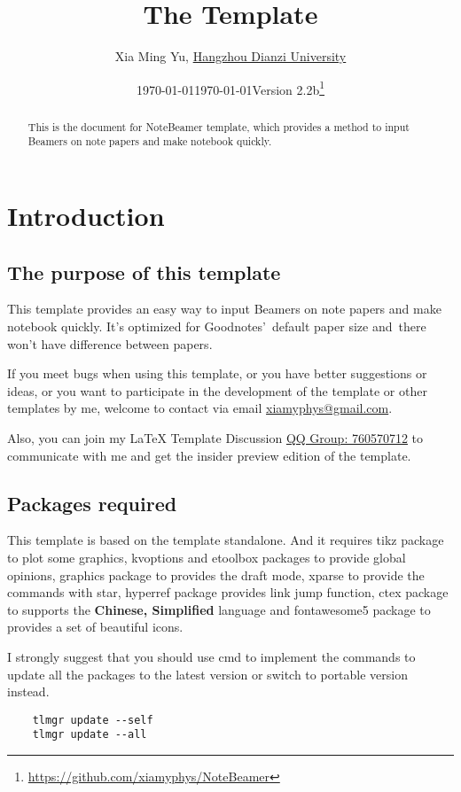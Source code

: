 \documentclass[11pt]{article}
\title{The \pkg{NoteBeamer} Template}
\author[1]{Xia Ming Yu, \href{https://www.hdu.edu.cn}{Hangzhou Dianzi University}}
\date{\today}
\affil[1]{\href{mailto:xiamyphys@gmail.com}{\texttt{xiamyphys@gmail.com}}}
\date{\today\quad Version 2.2b\thanks{%
  \url{https://github.com/xiamyphys/NoteBeamer}}}
\makeatletter
\def\@pkg#1{\texorpdfstring{\href{https://www.ctan.org/pkg/#1}{\textcolor{pkgcolor}{\textsf{#1}}}}{“#1”}}
\def\s@pkg#1{\texorpdfstring{\textcolor{pkgcolor}{\textsf{#1}}}{“#1”}}
\DeclareRobustCommand\pkg{\@ifstar\s@pkg\@pkg}
\def\mode#1{\texorpdfstring{\textcolor{moducolor}{\textsf{#1}}}{“#1”}}
\makeatother
\begin{document}
\maketitle

\begin{abstract}
This is the document for \pkg{NoteBeamer} template, which provides a method to input Beamers on note papers and make notebook quickly.

\end{abstract}

\tableofcontents

\section{Introduction}

\subsection{The purpose of this template}
This template provides an easy way to input Beamers on note papers and make notebook quickly. It's optimized for Goodnotes' default paper size and there won't have difference between papers.

If you meet bugs when using this template, or you have better suggestions or ideas, or you want to participate in the development of the template or other templates by me, welcome to contact via email \href{mailto:xiamyphys@gmail.com}{xiamyphys@gmail.com}.

Also, you can join my \textsf\LaTeX{} Template Discussion \href{https://qm.qq.com/q/OnHzbNvVAG}{QQ Group: 760570712} to communicate with me and get the insider preview edition of the template.

\subsection{Packages required}
This template is based on the template \pkg{standalone}. And it requires \pkg{tikz} package to plot some graphics, \pkg{kvoptions} and \pkg{etoolbox} packages to provide global opinions, \pkg{graphics} package to provides the \mode{draft} mode, \pkg{xparse} to provide the commands with star, \pkg{hyperref} package provides link jump function, \pkg{ctex} package to supports the \textbf{Chinese, Simplified} language and \pkg{fontawesome5} package to provides a set of beautiful icons.

I strongly suggest that you should use cmd to implement the commands to update all the packages to the latest version or switch to portable version instead.
\begin{verbatim}
    tlmgr update --self
    tlmgr update --all
\end{verbatim}
\end{document}
